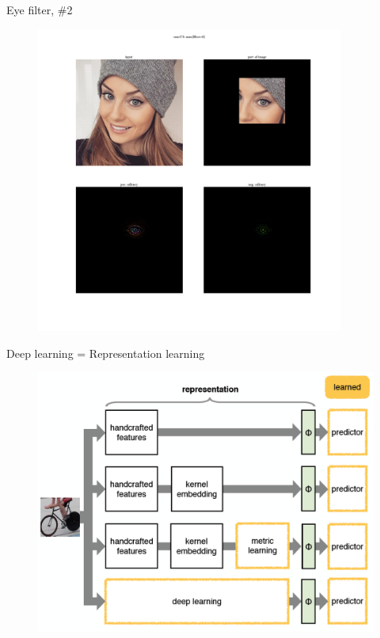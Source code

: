\documentclass{beamer}
\begin{document}
\begin{frame}{Eye filter, \#2}

\begin{figure}[h!]
  \centering
  \includegraphics[width=0.9\textwidth]{images/eye2.png}
\end{figure}

\end{frame}


\begin{frame}{Deep learning = Representation learning}

\begin{figure}[h!]
  \centering
  \includegraphics[width=1\textwidth]{images/ife.png}
\end{figure}

\end{frame}
\end{document}
